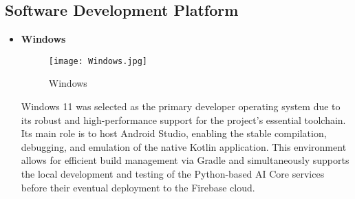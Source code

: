 \documentclass[conference]{IEEEtran}
\begin{document}
\subsection{Software Development Platform}
\begin{itemize}
    \item \textbf{Windows}\par
        \begin{figure}[h]
        \centering
        \texttt{[image: Windows.jpg]}
        \centering
        \caption{Windows} 
        \end{figure}\par
    Windows 11 was selected as the primary developer operating system due to its robust and high-performance support for the project's essential toolchain. Its main role is to host Android Studio, enabling the stable compilation, debugging, and emulation of the native Kotlin application. This environment allows for efficient build management via Gradle and simultaneously supports the local development and testing of the Python-based AI Core services before their eventual deployment to the Firebase cloud.
\end{itemize}
\end{document}
